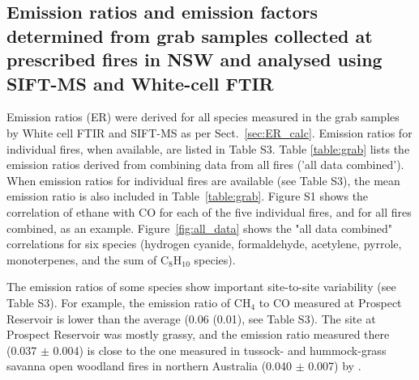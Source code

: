 \documentclass[acp, manuscript]{copernicus}
\begin{document}
\subsection{Emission ratios and emission factors determined from grab samples collected at prescribed fires in NSW and analysed using SIFT-MS and White-cell FTIR} 
Emission ratios (ER) were derived for all species measured in the grab samples by White cell FTIR and SIFT-MS as per Sect.~\ref{sec:ER_calc}. Emission ratios for individual fires, when available, are listed in Table S3. Table \ref{table:grab} lists the emission ratios derived from combining data from all fires ('all data combined'). When emission ratios for individual fires are available (see Table S3), the mean emission ratio is also included in Table~\ref{table:grab}. Figure S1 shows the correlation of ethane with CO for each of the five individual fires, and for all fires combined, as an example. Figure~\ref{fig:all_data} shows the "all data combined" correlations for six species (hydrogen cyanide, formaldehyde, acetylene, pyrrole, monoterpenes, and the sum of C$_8$H$_{10}$ species).

The emission ratios of some species show important site-to-site variability (see Table S3). For example, the emission ratio of CH$_4$ to CO measured at Prospect Reservoir is lower than the average (0.06 (0.01), see Table S3). The site at Prospect Reservoir was mostly grassy, and the emission ratio measured there (0.037 $\pm$ 0.004) is close to the one measured in tussock- and hummock-grass savanna open woodland fires in northern Australia (0.040 $\pm$ 0.007) by \citet{Smith2014}.
\end{document}
